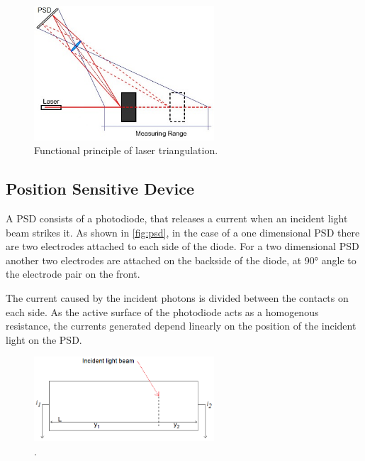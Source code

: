 \begin{figure}[H]
	\centering
	\includegraphics[angle=0,width=0.6\textwidth]{img/lasertriang}
	\caption{Functional principle of laser triangulation.}
	\label{fig:lasertriang}
\end{figure}

\subsection{\label{psd}Position Sensitive Device}

A PSD consists of a photodiode, that releases a current when an incident light beam strikes it. As shown in \ref{fig:psd}, in the case of a one dimensional PSD there are two electrodes attached to each side of the diode. For a two dimensional PSD another two electrodes are attached on the backside of the diode, at 90° angle to the electrode pair on the front.\cite{sitek}\cite{lecturenotes}


The current caused by the incident photons is divided between the contacts on each side. As the active surface of the photodiode acts as a homogenous resistance, the currents generated depend linearly on the position of the incident light on the PSD. 

\begin{figure}[H]
	\centering
	\includegraphics[angle=0,width=0.6\textwidth]{img/psd_calc}
	\caption{.}
	\label{fig:psd2}
\end{figure}

